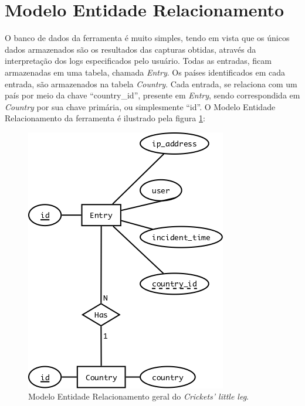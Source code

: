 \clearpage
\section{Modelo Entidade Relacionamento}

O banco de dados da ferramenta é muito simples, tendo em vista que os únicos dados armazenados são os resultados das capturas obtidas, através da interpretação dos logs especificados pelo usuário. Todas as entradas, ficam armazenadas em uma tabela, chamada \textit{Entry}. Os países identificados em cada entrada, são armazenados na tabela \textit{Country}. Cada entrada, se relaciona com um país por meio da chave ``country\_id'', presente em \textit{Entry}, sendo correspondida em \textit{Country} por sua chave primária, ou simplesmente ``id''. O Modelo Entidade Relacionamento da ferramenta é ilustrado pela figura \ref{figura:er}:

\begin{figure}[hc]
    \begin{center}
        \includegraphics[scale=0.5]{./figuras/er.png}

        \caption{\label{figura:er}Modelo Entidade Relacionamento geral do \textit{Crickets' little leg}.}
    \end{center}
\end{figure}
